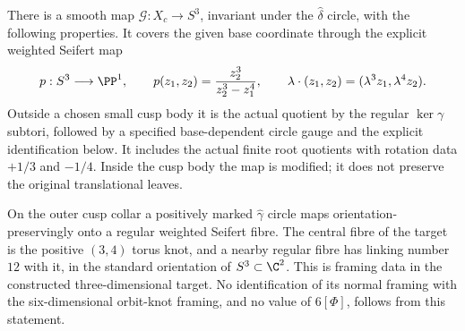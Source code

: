\begin{proposition}\label{push:src:C.3.13}
There is a smooth map $\mathcal G:X_c\to S^3$, invariant under
the $\widehat\delta$ circle, with the following properties.
It covers the given base coordinate through the explicit weighted
Seifert map
\[
 p:S^3\longrightarrow\PP^1,\qquad
 p(z_1,z_2)=\frac{z_2^3}{z_2^3-z_1^4},\qquad
 \lambda\cdot(z_1,z_2)=(\lambda^3z_1,\lambda^4z_2).
\]
Outside a chosen small cusp body it is the actual quotient by
the regular $\ker\gamma$ subtori, followed by a specified
base-dependent circle gauge and the explicit identification below.
It includes the actual finite root quotients with rotation data
$+1/3$ and $-1/4$. Inside the cusp body the map is modified;
it does not preserve the original translational leaves.

On the outer cusp collar a positively marked $\widehat\gamma$
circle maps orientation-preservingly onto a regular weighted
Seifert fibre. The central fibre of the target is the positive
$(3,4)$ torus knot, and a nearby regular fibre has linking number
$12$ with it, in the standard orientation of $S^3\subset\C^2$.
This is framing data in the constructed three-dimensional target.
No identification of its normal framing with the six-dimensional
orbit-knot framing, and no value of $6[\Phi]$, follows from this
statement.
\end{proposition}
